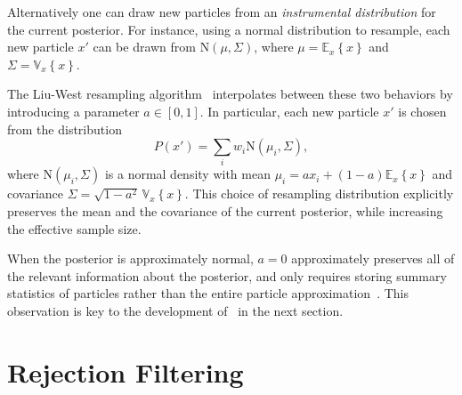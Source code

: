 \documentclass[twoside]{article}
\newcommand{\expect}[2]{{\mathbb{E}_{#2}}\!\left\{#1 \right\}}
\newcommand{\var}[2]{{\mathbb{V}_{#2}}\!\left\{#1 \right\}}
\newcommand{\CRej}{\text{rejection filtering}}
\newcommand{\NN}{\mathrm{N}}
\begin{document}
Alternatively one can draw new particles from an \emph{instrumental distribution} for
the current posterior. For instance, using a normal distribution to resample,
each new particle $x'$ can be drawn from $\NN(\mu, \Sigma)$, where
$\mu = \expect{x}{x}$ and $\Sigma = \var{x}{x}$.

The Liu-West resampling algorithm~\cite{liu2001combined} interpolates between these two
behaviors by introducing a parameter $a \in [0, 1]$. In particular, each new particle
$x'$ is chosen from the distribution
\begin{equation}
  \label{eq:liu-west}
  P(x') = \sum_i w_i \NN(\mu_i, \Sigma),
\end{equation}
where $\NN(\mu_i, \Sigma)$ is a normal density with mean
$\mu_i = a x_i + (1 - a) \expect xx$
and covariance $\Sigma = \sqrt{1 - a^2}\,\var{x}{x}$.
This choice of resampling distribution explicitly preserves the mean
and the covariance of the current posterior, while increasing the
effective sample size.

When the posterior is approximately normal, $a = 0$ approximately
preserves all of the relevant information about the posterior, and  only requires
storing summary statistics of particles rather than the entire particle
approximation~\cite{del2012adaptive,sisson_sequential_2007}.   This observation is key to
the development of \CRej~in the next section.



\section{Rejection Filtering}\label{sec:method}



\end{document}
